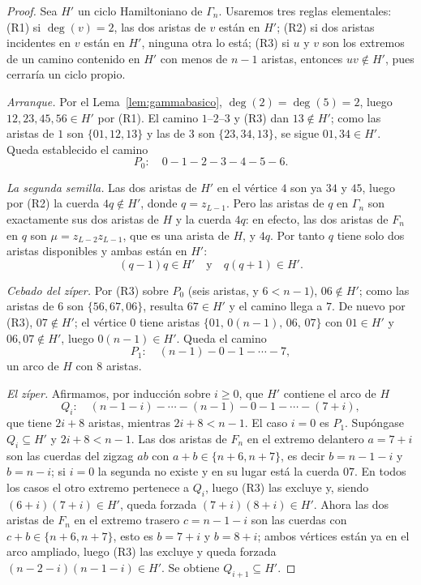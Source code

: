\documentclass[11pt,a4paper]{article}
\theoremstyle{definition}
\theoremstyle{remark}
\begin{document}
\begin{proof}
Sea $H'$ un ciclo Hamiltoniano de $\Gamma_n$. Usaremos tres reglas elementales: (R1) si $\deg(v)=2$, las dos aristas de $v$ están en $H'$; (R2) si dos aristas incidentes en $v$ están en $H'$, ninguna otra lo está; (R3) si $u$ y $v$ son los extremos de un camino contenido en $H'$ con menos de $n-1$ aristas, entonces $uv\notin H'$, pues cerraría un ciclo propio.

\emph{Arranque.} Por el Lema~\ref{lem:gammabasico}, $\deg(2)=\deg(5)=2$, luego $12,23,45,56\in H'$ por (R1). El camino $1$--$2$--$3$ y (R3) dan $13\notin H'$; como las aristas de $1$ son $\{01,12,13\}$ y las de $3$ son $\{23,34,13\}$, se sigue $01,34\in H'$. Queda establecido el camino
\[
P_0:\quad 0-1-2-3-4-5-6 .
\]

\emph{La segunda semilla.} Las dos aristas de $H'$ en el vértice $4$ son ya $34$ y $45$, luego por (R2) la cuerda $4q\notin H'$, donde $q=z_{L-1}$. Pero las aristas de $q$ en $\Gamma_n$ son exactamente sus dos aristas de $H$ y la cuerda $4q$: en efecto, las dos aristas de $F_n$ en $q$ son $\mu=z_{L-2}z_{L-1}$, que es una arista de $H$, y $4q$. Por tanto $q$ tiene solo dos aristas disponibles y ambas están en $H'$:
\begin{equation}\label{eq:semilla2}
(q-1)q\in H'\quad\text{y}\quad q(q+1)\in H'.
\end{equation}

\emph{Cebado del zíper.} Por (R3) sobre $P_0$ (seis aristas, y $6<n-1$), $06\notin H'$; como las aristas de $6$ son $\{56,67,06\}$, resulta $67\in H'$ y el camino llega a $7$. De nuevo por (R3), $07\notin H'$; el vértice $0$ tiene aristas $\{01,\,0(n{-}1),\,06,\,07\}$ con $01\in H'$ y $06,07\notin H'$, luego $0(n{-}1)\in H'$. Queda el camino
\[
P_1:\quad (n-1)-0-1-\cdots-7 ,
\]
un arco de $H$ con $8$ aristas.

\emph{El zíper.} Afirmamos, por inducción sobre $i\ge0$, que $H'$ contiene el arco de $H$
\[
Q_i:\quad (n-1-i)-\cdots-(n-1)-0-1-\cdots-(7+i),
\]
que tiene $2i+8$ aristas, mientras $2i+8<n-1$. El caso $i=0$ es $P_1$. Supóngase $Q_i\subseteq H'$ y $2i+8<n-1$. Las dos aristas de $F_n$ en el extremo delantero $a=7+i$ son las cuerdas del zigzag $a b$ con $a+b\in\{n+6,n+7\}$, es decir $b=n-1-i$ y $b=n-i$; si $i=0$ la segunda no existe y en su lugar está la cuerda $07$. En todos los casos el otro extremo pertenece a $Q_i$, luego (R3) las excluye y, siendo $(6+i)(7+i)\in H'$, queda forzada $(7+i)(8+i)\in H'$. Ahora las dos aristas de $F_n$ en el extremo trasero $c=n-1-i$ son las cuerdas con $c+b\in\{n+6,n+7\}$, esto es $b=7+i$ y $b=8+i$; ambos vértices están ya en el arco ampliado, luego (R3) las excluye y queda forzada $(n-2-i)(n-1-i)\in H'$. Se obtiene $Q_{i+1}\subseteq H'$.


\end{proof}
\end{document}
